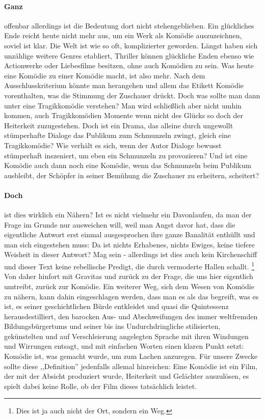 \paragraph{Ganz} 
offenbar allerdings ist die Bedeutung dort nicht stehengeblieben. 
Ein glückliches Ende reicht heute nicht mehr aus, um ein Werk als Komödie auszuzeichnen, soviel ist klar. 
Die Welt ist wie so oft, komplizierter geworden.
Längst haben sich unzählige weitere Genres etabliert, Thriller können glückliche Enden ebenso wie Actionwerke oder Liebesfilme besitzen, ohne auch Komödien zu sein.
Was heute eine Komödie zu einer Komödie macht, ist also mehr.
Nach dem Ausschlusskriterium könnte man herangehen und allem das Etikett Komödie vorenthalten, was die Stimmung der Zuschauer drückt. 
Doch was sollte man dann unter eine Tragikkomödie verstehen?
Man wird schließlich aber nicht umhin kommen, auch Tragikkomödien Momente wenn nicht des Glücks so doch der Heiterkeit zuzugestehen.
Doch ist ein Drama, das alleine durch ungewollt stümperhafte Dialoge das Publikum zum Schmunzeln zwingt, gleich eine Tragikkomödie?
Wie verhält es sich, wenn der Autor Dialoge bewusst stümperhaft inszeniert, um eben ein Schmunzeln zu provozieren? 
Und ist eine Komödie auch dann noch eine Komödie, wenn das Schmunzeln beim Publikum ausbleibt, der Schöpfer in seiner Bemühung die Zuschauer zu erheitern, scheitert?
\paragraph{Doch} ist dies wirklich ein Nähern? Ist es nicht vielmehr ein Davonlaufen, da man der Frage im Grunde nur ausweichen will, weil man Angst davor hat, dass die eigentliche Antwort erst einmal ausgesprochen ihre ganze Banalität enthüllt und man sich eingestehen muss: Da ist nichts Erhabenes, nichts Ewiges, keine tiefere Weisheit in dieser Antwort?
Mag sein - allerdings ist dies auch kein Kirchenschiff und dieser Text keine rebellische Predigt, die durch vermoderte Hallen schallt. \footnote{Dies ist ja auch nicht der Ort, sondern ein Weg.}
Von daher hinfort mit Gravitas und zurück zu der Frage, die uns hier eigentlich umtreibt, zurück zur Komödie.
Ein weiterer Weg, sich dem Wesen von Komödie zu nähern, kann dahin eingeschlagen werden, dass man es als das begreift, was es ist, es seiner geschichtlichen Bürde entkleidet und quasi die Quintessenz herausdestilliert, den barocken Aus- und Abschweifungen des immer weltfremden Bildungsbürgertums und seiner bis ins Undurchdringliche stilisierten, gekünstelten und auf Verschleierung angelegten Sprache mit ihren Windungen und Wirrungen entsagt, und mit einfachen Worten einen klaren Punkt setzt: 
Komödie ist, was gemacht wurde, um zum Lachen anzuregen. 
Für unsere Zwecke sollte diese ,,Definition'' jedenfalls allemal hinreichen:
Eine Komödie ist ein Film, der mit der Absicht produziert wurde, Heiterkeit und Gelächter auszulösen, es spielt dabei keine Rolle, ob der Film dieses tatsächlich leistet.
